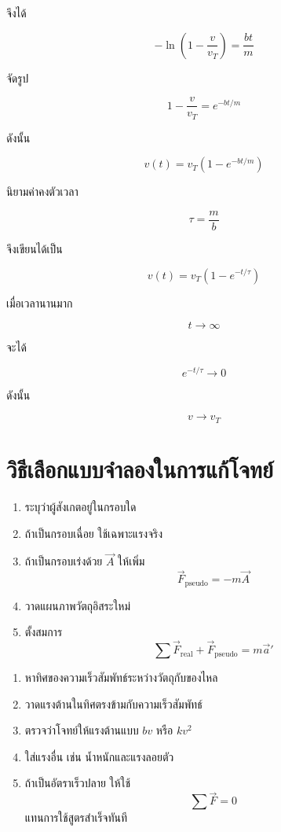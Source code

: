 จึงได้

\[
-\ln\left(1-\frac{v}{v_T}\right)
=
\frac{bt}{m}
\]

จัดรูป

\[
1-\frac{v}{v_T}
=
e^{-bt/m}
\]

ดังนั้น

\[
\boxed{
v(t)
=
v_T\left(1-e^{-bt/m}\right)
}
\]

นิยามค่าคงตัวเวลา

\[
\boxed{
\tau=\frac{m}{b}
}
\]

จึงเขียนได้เป็น

\[
\boxed{
v(t)
=
v_T\left(1-e^{-t/\tau}\right)
}
\]

เมื่อเวลานานมาก

\[
t\rightarrow\infty
\]

จะได้

\[
e^{-t/\tau}\rightarrow0
\]

ดังนั้น

\[
v\rightarrow v_T
\]

\section{วิธีเลือกแบบจำลองในการแก้โจทย์}

\begin{tcolorbox}[title=แผนแก้โจทย์กรอบเร่ง]
\begin{enumerate}
    \item ระบุว่าผู้สังเกตอยู่ในกรอบใด
    \item ถ้าเป็นกรอบเฉื่อย ใช้เฉพาะแรงจริง
    \item ถ้าเป็นกรอบเร่งด้วย $\vec A$ ให้เพิ่ม
    \[
    \vec F_{\text{pseudo}}=-m\vec A
    \]
    \item วาดแผนภาพวัตถุอิสระใหม่
    \item ตั้งสมการ
    \[
    \sum\vec F_{\text{real}}+\vec F_{\text{pseudo}}
    =m\vec a'
    \]
\end{enumerate}
\end{tcolorbox}

\begin{tcolorbox}[title=แผนแก้โจทย์แรงต้านของไหล]
\begin{enumerate}
    \item หาทิศของความเร็วสัมพัทธ์ระหว่างวัตถุกับของไหล
    \item วาดแรงต้านในทิศตรงข้ามกับความเร็วสัมพัทธ์
    \item ตรวจว่าโจทย์ให้แรงต้านแบบ $bv$ หรือ $kv^2$
    \item ใส่แรงอื่น เช่น น้ำหนักและแรงลอยตัว
    \item ถ้าเป็นอัตราเร็วปลาย ให้ใช้
    \[
    \sum\vec F=0
    \]
    แทนการใช้สูตรสำเร็จทันที
\end{enumerate}
\end{tcolorbox}

